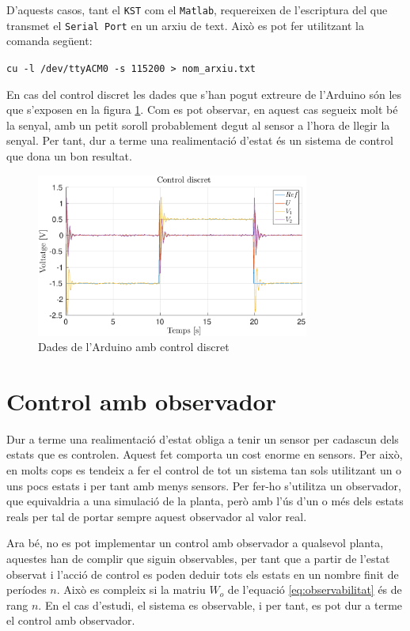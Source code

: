 \documentclass[12pt,a4paper,final,twoside,openright]{report}
\begin{document}
D'aquests casos, tant el \texttt{KST} com el \texttt{Matlab}, requereixen de l'escriptura del que transmet el \texttt{Serial Port} en un arxiu de text. Això es pot fer utilitzant la comanda següent:

\texttt{cu -l /dev/ttyACM0 -s 115200 > nom\_arxiu.txt}

\vspace{10pt}
En cas del control discret les dades que s'han pogut extreure de l'Arduino són les que s'exposen en la figura \ref{fig:dis_all}. Com es pot observar, en aquest cas segueix molt bé la senyal, amb un petit soroll probablement degut al sensor a l'hora de llegir la senyal. Per tant, dur a terme una realimentació d'estat és un sistema de control que dona un bon resultat.

\begin{figure}
\centering
\includegraphics[width=0.8\textwidth]{Imatges/dis_all.eps}
\caption{Dades de l'Arduino amb control discret\label{fig:dis_all}}
\end{figure}

\section{Control amb observador}

Dur a terme una realimentació d'estat obliga a tenir un sensor per cadascun dels estats que es controlen. Aquest fet comporta un cost enorme en sensors. Per això, en molts cops es tendeix a fer el control de tot un sistema tan sols utilitzant un o uns pocs estats i per tant amb menys sensors. Per fer-ho s'utilitza un observador, que equivaldria a una simulació de la planta, però amb l'ús d'un o més dels estats reals per tal de portar sempre aquest observador al valor real.

Ara bé, no es pot implementar un control amb observador a qualsevol planta, aquestes han de complir que siguin observables, per tant que a partir de l'estat observat i l'acció de control es poden deduir tots els estats en un nombre finit de períodes $n$. Això es compleix si la matriu $W_o$ de l'equació \eqref{eq:observabilitat} és de rang $n$. En el cas d'estudi, el sistema es observable, i per tant, es pot dur a terme el control amb observador.
\vspace{-10pt}
\end{document}
